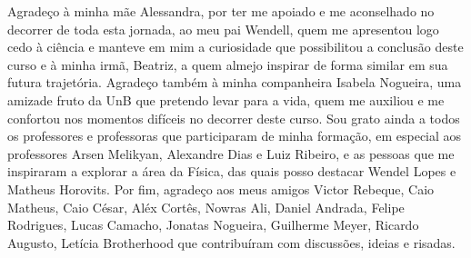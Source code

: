 Agradeço à minha mãe Alessandra, por ter me apoiado e me aconselhado no decorrer
de toda esta jornada, ao meu pai Wendell, quem me apresentou logo cedo à ciência
e manteve em mim a curiosidade que possibilitou a conclusão deste curso e à
minha irmã, Beatriz, a quem almejo inspirar de forma similar em sua futura
trajetória. Agradeço também à minha companheira Isabela Nogueira, uma amizade
fruto da UnB que pretendo levar para a vida, quem me auxiliou e me confortou nos
momentos difíceis no decorrer deste curso. Sou grato ainda a todos os
professores e professoras que participaram de minha formação, em especial aos
professores Arsen Melikyan, Alexandre Dias e Luiz Ribeiro, e as pessoas que me
inspiraram a explorar a área da Física, das quais posso destacar Wendel Lopes e
Matheus Horovits. Por fim, agradeço aos meus amigos Victor Rebeque, Caio
Matheus, Caio César, Aléx Cortês, Nowras Ali, Daniel Andrada, Felipe
Rodrigues, Lucas Camacho, Jonatas Nogueira, Guilherme Meyer, Ricardo Augusto,
Letícia Brotherhood que contribuíram com discussões, ideias e risadas.
